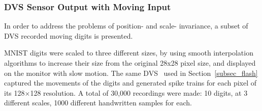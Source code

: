 	\subsubsection{DVS Sensor Output with Moving Input}
	In order to address the problems of position- and scale- invariance, a subset of DVS recorded moving digits is presented.
	
	MNIST digits were scaled to three different sizes, by using smooth interpolation algorithms to increase their size from the original 28x28 pixel size, and displayed on the monitor with slow motion. 
	The same DVS~\citep{serrano2013128} used in Section~\ref{subsec_flash} captured the movements of the digits and generated spike trains for each pixel of its 128$\times$128 resolution.
	A total of 30,000 recordings were made: 10 digits, at 3 different scales, 1000 different handwritten samples for each.
	